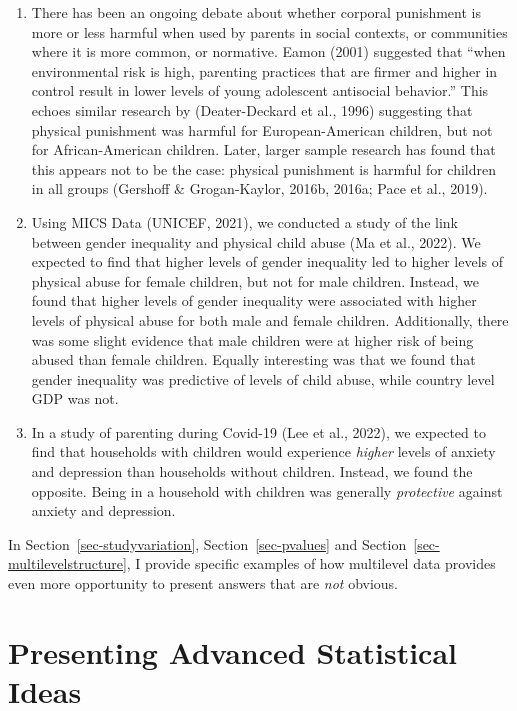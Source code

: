 \documentclass[
  letterpaper,
  DIV=11,
  numbers=noendperiod]{scrreprt}
\providecommand{\tightlist}{%
  \setlength{\itemsep}{0pt}\setlength{\parskip}{0pt}}\usepackage{longtable,booktabs,array}
\begin{document}
\begin{enumerate}
\def\labelenumi{\arabic{enumi}.}
\tightlist
\item
  There has been an ongoing debate about whether corporal punishment is
  more or less harmful when used by parents in social contexts, or
  communities where it is more common, or normative. Eamon (2001)
  suggested that ``when environmental risk is high, parenting practices
  that are firmer and higher in control result in lower levels of young
  adolescent antisocial behavior.'' This echoes similar research by
  (Deater-Deckard et al., 1996) suggesting that physical punishment was
  harmful for European-American children, but not for African-American
  children. Later, larger sample research has found that this appears
  not to be the case: physical punishment is harmful for children in all
  groups (Gershoff \& Grogan-Kaylor, 2016b, 2016a; Pace et al., 2019).
\item
  Using MICS Data (UNICEF, 2021), we conducted a study of the link
  between gender inequality and physical child abuse (Ma et al., 2022).
  We expected to find that higher levels of gender inequality led to
  higher levels of physical abuse for female children, but not for male
  children. Instead, we found that higher levels of gender inequality
  were associated with higher levels of physical abuse for both male and
  female children. Additionally, there was some slight evidence that
  male children were at higher risk of being abused than female
  children. Equally interesting was that we found that gender inequality
  was predictive of levels of child abuse, while country level GDP was
  not.
\item
  In a study of parenting during Covid-19 (Lee et al., 2022), we
  expected to find that households with children would experience
  \emph{higher} levels of anxiety and depression than households without
  children. Instead, we found the opposite. Being in a household with
  children was generally \emph{protective} against anxiety and
  depression.
\end{enumerate}

In Section~\ref{sec-studyvariation}, Section~\ref{sec-pvalues} and
Section~\ref{sec-multilevelstructure}, I provide specific examples of
how multilevel data provides even more opportunity to present answers
that are \emph{not} obvious.

\hypertarget{presenting-advanced-statistical-ideas}{%
\section{Presenting Advanced Statistical
Ideas}\label{presenting-advanced-statistical-ideas}}
\end{document}
